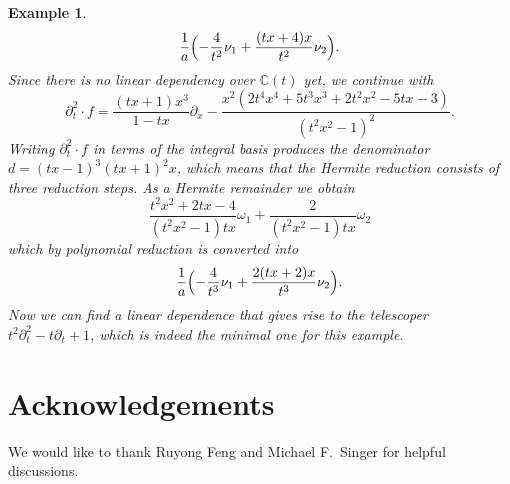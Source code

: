 \documentclass{sig-alternate}
\newtheorem{example}[theorem]{Example}
\newcommand{\bC}{ {\mathbb C}}
\begin{document}
\begin{example}
\[
  \frac1a \Bigl( -\frac{4}{t^2} \nu_1 + \frac{(tx+4)x}{t^2} \nu_2 \Bigr).
\]
Since there is no linear dependency over $\bC(t)$ yet, we continue with
\[
  \partial_t^2\cdot f =
  \frac{(tx+1)x^3}{1-tx} \partial_x -
  \frac{x^2(2t^4x^4+5t^3x^3+2t^2x^2-5tx-3)}{(t^2x^2-1)^2}.
\]
Writing $\partial_t^2\cdot f$ in terms of the integral basis produces the denominator
$d=(tx-1)^3(tx+1)^2x$, which means that the Hermite reduction consists of three
reduction steps. As a Hermite remainder we obtain
\[
  \frac{t^2x^2+2tx-4}{(t^2x^2-1)tx} \omega_1 + \frac{2}{(t^2x^2-1)tx} \omega_2
\]
which by polynomial reduction is converted into
\[
  \frac1a \Bigl( -\frac{4}{t^3} \nu_1 + \frac{2(tx+2)x}{t^3} \nu_2 \Bigr).
\]
Now we can find a linear dependence that gives rise to the telescoper
$t^2\partial_t^2-t\partial_t+1$, which is indeed the minimal one for this example.
\end{example}

\section*{Acknowledgements}

We would like to thank Ruyong Feng and Michael F.\ Singer for helpful discussions.



\end{document}
